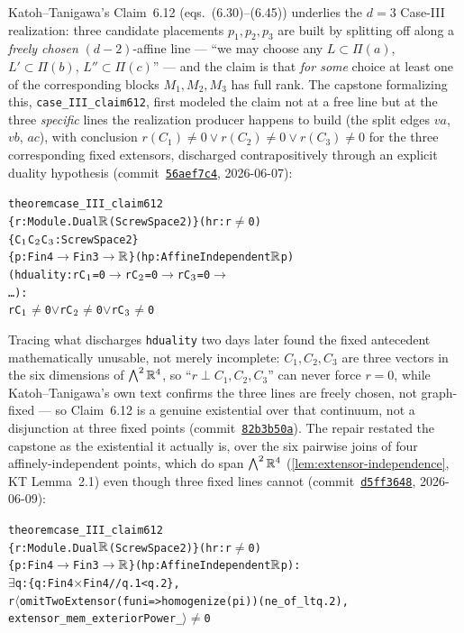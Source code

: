 Katoh--Tanigawa's Claim~6.12 \cite[\S6.4.1]{katohTanigawa2011} (eqs.~(6.30)--(6.45))
underlies the $d = 3$ Case-III realization: three candidate placements
$p_1, p_2, p_3$ are built by splitting off along a \emph{freely chosen}
$(d-2)$-affine line --- ``we may choose any $L \subset \Pi(a)$,
$L' \subset \Pi(b)$, $L'' \subset \Pi(c)$'' --- and the claim is that
\emph{for some} choice at least one of the corresponding blocks $M_1, M_2,
M_3$ has full rank. The capstone formalizing this,
\texttt{case\_III\_claim612}, first modeled the claim not at a free line but
at the three \emph{specific} lines the realization producer happens to
build (the split edges $va$, $vb$, $ac$), with conclusion $r(C_1) \ne 0 \lor
r(C_2) \ne 0 \lor r(C_3) \ne 0$ for the three corresponding fixed
extensors, discharged contrapositively through an explicit duality
hypothesis
(commit~\href{https://github.com/bryangingechen/CombinatorialRigidity/commit/56aef7c487b6e2ad63903f09ece3b487a4efefdb}{\texttt{56aef7c4}},
2026-06-07):
\begin{alltt}
theorem case_III_claim612
    \{r : Module.Dual \(\R\) (ScrewSpace 2)\} (hr : r \(\neq\) 0)
    \{C\(\sb{1}\) C\(\sb{2}\) C\(\sb{3}\) : ScrewSpace 2\}
    \{p : Fin 4 \(\to\) Fin 3 \(\to\) \(\R\)\} (hp : AffineIndependent \(\R\) p)
    (hduality : r C\(\sb{1}\) = 0 \(\to\) r C\(\sb{2}\) = 0 \(\to\) r C\(\sb{3}\) = 0 \(\to\)
      \dots) :
    r C\(\sb{1}\) \(\neq\) 0 \(\vee\) r C\(\sb{2}\) \(\neq\) 0 \(\vee\) r C\(\sb{3}\) \(\neq\) 0
\end{alltt}
Tracing what discharges \texttt{hduality} two days later found the fixed
antecedent mathematically unusable, not merely incomplete: $C_1, C_2, C_3$
are three vectors in the six dimensions of $\bigwedge^2 {\mathbb{R}}^4$, so
``$r \perp C_1, C_2, C_3$'' can never force $r = 0$, while Katoh--Tanigawa's
own text confirms the three lines are freely chosen, not graph-fixed --- so
Claim~6.12 is a genuine existential over that continuum, not a disjunction
at three fixed points
(commit~\href{https://github.com/bryangingechen/CombinatorialRigidity/commit/82b3b50af7462aeba2e081608b92a3d43cd31aba}{\texttt{82b3b50a}}).
The repair restated the capstone as the existential it actually is, over the
six pairwise joins of four affinely-independent points, which do span
$\bigwedge^2 {\mathbb{R}}^4$ (\cref{lem:extensor-independence}, KT Lemma~2.1) even
though three fixed lines cannot
(commit~\href{https://github.com/bryangingechen/CombinatorialRigidity/commit/d5ff364821581017823283d12f7c15b311f7a9b4}{\texttt{d5ff3648}},
2026-06-09):
\begin{alltt}
theorem case_III_claim612
    \{r : Module.Dual \(\R\) (ScrewSpace 2)\} (hr : r \(\neq\) 0)
    \{p : Fin 4 \(\to\) Fin 3 \(\to\) \(\R\)\} (hp : AffineIndependent \(\R\) p) :
    \(\exists\) q : \{q : Fin 4 \(\times\) Fin 4 // q.1 < q.2\},
      r \(\langle\)omitTwoExtensor (fun i => homogenize (p i)) (ne_of_lt q.2),
        extensor_mem_exteriorPower _\(\rangle\) \(\neq\) 0
\end{alltt}
